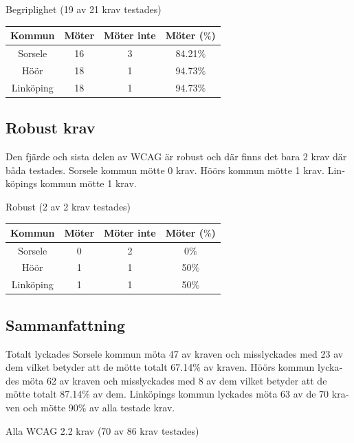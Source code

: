 \documentclass[11p]{article}
\begin{document}
\begin{otherlanguage}{swedish}
    \newpage
    \begin{center}
    Begriplighet (19 av 21 krav testades)

    \begin{tabular}{ |c|c|c|c|}
        \hline
        Kommun & Möter & Möter inte & Möter ($\%$) \\  \hline
        Sorsele & 16 & 3 & 84.21$\%$ \\ \hline
        Höör & 18 & 1 & 94.73$\%$ \\ \hline
        Linköping & 18 & 1 & 94.73$\%$ \\ \hline
    \end{tabular}
    \end{center}

    \subsection{Robust krav}
    Den fjärde och sista delen av WCAG är robust och där finns det bara 2 krav där båda testades.
    Sorsele kommun mötte 0 krav.
    Höörs kommun mötte 1 krav.
    Linköpings kommun mötte 1 krav.

    \begin{center}
    Robust (2 av 2 krav testades)

    \begin{tabular}{ |c|c|c|c|}
        \hline
        Kommun & Möter & Möter inte & Möter ($\%$) \\  \hline
        Sorsele & 0 & 2 & 0$\%$ \\ \hline
        Höör & 1 & 1 & 50$\%$ \\ \hline
        Linköping & 1 & 1 & 50$\%$ \\ \hline
    \end{tabular}
    \end{center}
    
    \subsection{Sammanfattning}
    Totalt lyckades Sorsele kommun möta 47 av kraven och misslyckades med 23 av dem vilket betyder att de mötte totalt 67.14$\%$ av kraven.
    Höörs kommun lyckades möta 62 av kraven och misslyckades med 8 av dem vilket betyder att de mötte totalt 87.14$\%$ av dem.
    Linköpings kommun lyckades möta 63 av de 70 kraven och mötte 90$\%$ av alla testade krav.

    \begin{center}
    Alla WCAG 2.2 krav (70 av 86 krav testades)


\end{center}
\end{otherlanguage}
\end{document}
